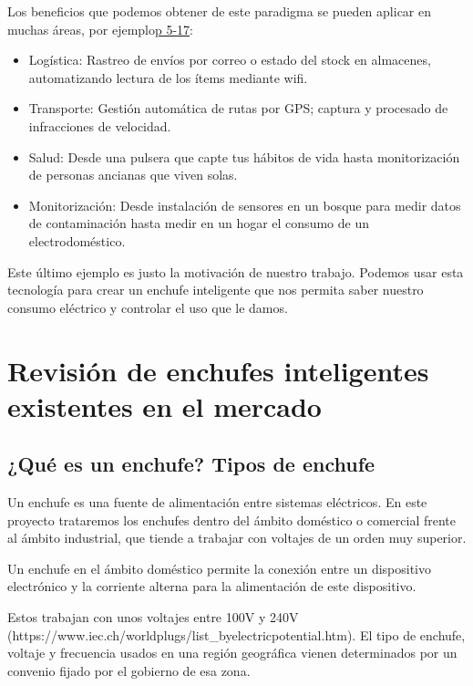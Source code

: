 \documentclass[a4paper,10pt]{article}
\begin{document}
Los beneficios que podemos obtener de este paradigma se pueden aplicar
en muchas áreas, por
ejemplo\href{http://ird.sut.ac.th/e-journal/Journal/suwimonv/1403739/1403739.pdf}{p
5-17}:

\begin{itemize}
\item
  Logística: Rastreo de envíos por correo o estado del stock en
  almacenes, automatizando lectura de los ítems mediante wifi.
\item
  Transporte: Gestión automática de rutas por GPS; captura y procesado
  de infracciones de velocidad.
\item
  Salud: Desde una pulsera que capte tus hábitos de vida hasta
  monitorización de personas ancianas que viven solas.
\item
  Monitorización: Desde instalación de sensores en un bosque para medir
  datos de contaminación hasta medir en un hogar el consumo de un
  electrodoméstico.
\end{itemize}

Este último ejemplo es justo la motivación de nuestro trabajo. Podemos
usar esta tecnología para crear un enchufe inteligente que nos permita
saber nuestro consumo eléctrico y controlar el uso que le damos.

\section{Revisión de enchufes inteligentes existentes en el
mercado}\label{revisiuxf3n-de-enchufes-inteligentes-existentes-en-el-mercado}

\subsection{¿Qué es un enchufe? Tipos de
enchufe}\label{quuxe9-es-un-enchufe-tipos-de-enchufe}

Un enchufe es una fuente de alimentación entre sistemas eléctricos. En
este proyecto trataremos los enchufes dentro del ámbito doméstico o
comercial frente al ámbito industrial, que tiende a trabajar con
voltajes de un orden muy superior.

Un enchufe en el ámbito doméstico permite la conexión entre un
dispositivo electrónico y la corriente alterna para la alimentación de
este dispositivo.

Estos trabajan con unos voltajes entre 100V y 240V
(https://www.iec.ch/worldplugs/list\_byelectricpotential.htm). El tipo
de enchufe, voltaje y frecuencia usados en una región geográfica vienen
determinados por un convenio fijado por el gobierno de esa zona.
\end{document}
